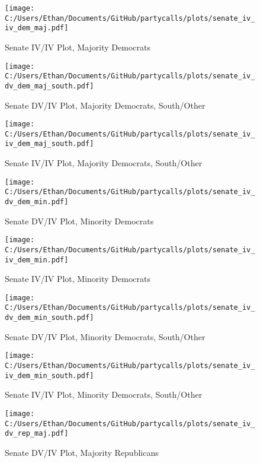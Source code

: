 \documentclass[12pt]{article}
\begin{document}
\begin{figure}[H]
	\centering
	\caption{Senate IV/IV Plot, Majority Democrats}
	\texttt{[image: C:/Users/Ethan/Documents/GitHub/partycalls/plots/senate\_iv\_iv\_dem\_maj.pdf]}
\end{figure}

\begin{figure}[H]
	\centering
	\caption{Senate DV/IV Plot, Majority Democrats, South/Other}
	\texttt{[image: C:/Users/Ethan/Documents/GitHub/partycalls/plots/senate\_iv\_dv\_dem\_maj\_south.pdf]}
\end{figure}

\begin{figure}[H]
	\centering
	\caption{Senate IV/IV Plot, Majority Democrats, South/Other}
	\texttt{[image: C:/Users/Ethan/Documents/GitHub/partycalls/plots/senate\_iv\_iv\_dem\_maj\_south.pdf]}
\end{figure}

\begin{figure}[H]
	\centering
	\caption{Senate DV/IV Plot, Minority Democrats}
	\texttt{[image: C:/Users/Ethan/Documents/GitHub/partycalls/plots/senate\_iv\_dv\_dem\_min.pdf]}
\end{figure}

\begin{figure}[H]
	\centering
	\caption{Senate IV/IV Plot, Minority Democrats}
	\texttt{[image: C:/Users/Ethan/Documents/GitHub/partycalls/plots/senate\_iv\_iv\_dem\_min.pdf]}
\end{figure}

\begin{figure}[H]
	\centering
	\caption{Senate DV/IV Plot, Minority Democrats, South/Other}
	\texttt{[image: C:/Users/Ethan/Documents/GitHub/partycalls/plots/senate\_iv\_dv\_dem\_min\_south.pdf]}
\end{figure}

\begin{figure}[H]
	\centering
	\caption{Senate IV/IV Plot, Minority Democrats, South/Other}
	\texttt{[image: C:/Users/Ethan/Documents/GitHub/partycalls/plots/senate\_iv\_iv\_dem\_min\_south.pdf]}
\end{figure}

\begin{figure}[H]
	\centering
	\caption{Senate DV/IV Plot, Majority Republicans}
	\texttt{[image: C:/Users/Ethan/Documents/GitHub/partycalls/plots/senate\_iv\_dv\_rep\_maj.pdf]}
\end{figure}
\end{document}
